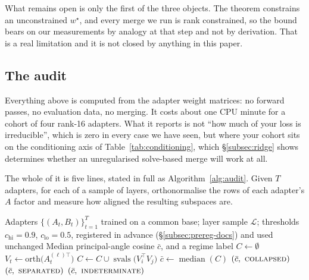What remains open is only the first of the three objects. The theorem
constrains an unconstrained $w^\star$, and every merge we run is rank
constrained, so the bound bears on our measurements by analogy at that step
and not by derivation. That is a real limitation and it is not closed by
anything in this paper.

\subsection{The audit}
\label{subsec:audit}

Everything above is computed from the adapter weight matrices: no forward
passes, no evaluation data, no merging. It costs about one CPU minute for a
cohort of four rank-16 adapters. What it reports is not ``how much of your loss
is irreducible'', which is zero in every case we have seen, but where your
cohort sits on the conditioning axis of Table~\ref{tab:conditioning}, which
\S\ref{subsec:ridge} shows determines whether an unregularised solve-based
merge will work at all.

The whole of it is five lines, stated in full as
Algorithm~\ref{alg:audit}. Given $T$ adapters, for each of a sample of
layers, orthonormalise the rows of each adapter's $A$ factor and measure how
aligned the resulting subspaces are.

\begin{algorithm}[t]
\caption{The pre-merge conditioning audit. It reads only the $A$ factors of
the adapter files: no $B$ factors, no base weights, no forward passes and no
evaluation data, which is what makes it runnable before committing to a
merge.}
\label{alg:audit}
\begin{algorithmic}[1]
\Require Adapters $\{(A_t, B_t)\}_{t=1}^{T}$ trained on a common base; layer
  sample $\mathcal{L}$; thresholds $c_{\mathrm{hi}} = 0.9$,
  $c_{\mathrm{lo}} = 0.5$, registered in advance
  (\S\ref{subsec:prereg-docs}) and used unchanged
\Ensure Median principal-angle cosine $\bar c$, and a regime label
\State $C \gets \emptyset$
    \State $V_t \gets \mathrm{orth}\bigl(A_t^{(\ell)\top}\bigr)$
  \EndFor
    \State $C \gets C \cup \operatorname{svals}\bigl(V_i^{\top} V_j\bigr)$
  \EndFor
\EndFor
\State $\bar c \gets \operatorname{median}(C)$
  \State \Return $(\bar c,\ \textsc{collapsed})$
  \State \Return $(\bar c,\ \textsc{separated})$
\Else
  \State \Return $(\bar c,\ \textsc{indeterminate})$
\EndIf
\end{algorithmic}
\end{algorithm}

